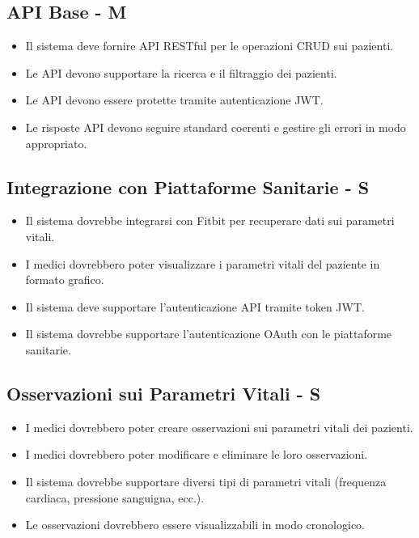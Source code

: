 \documentclass[12pt,a4paper,oneside]{report}
\begin{document}
\subsection{API Base - M}

\begin{itemize}
    \item Il sistema deve fornire API RESTful per le operazioni CRUD sui pazienti.
    \item Le API devono supportare la ricerca e il filtraggio dei pazienti.
    \item Le API devono essere protette tramite autenticazione JWT.
    \item Le risposte API devono seguire standard coerenti e gestire gli errori in modo appropriato.
\end{itemize}

\subsection{Integrazione con Piattaforme Sanitarie - S}

\begin{itemize}
    \item Il sistema dovrebbe integrarsi con Fitbit per recuperare dati sui parametri vitali.
    \item I medici dovrebbero poter visualizzare i parametri vitali del paziente in formato grafico.
    \item Il sistema deve supportare l'autenticazione API tramite token JWT.
    \item Il sistema dovrebbe supportare l'autenticazione OAuth con le piattaforme sanitarie.
\end{itemize}

\subsection{Osservazioni sui Parametri Vitali - S}

\begin{itemize}
    \item I medici dovrebbero poter creare osservazioni sui parametri vitali dei pazienti.
    \item I medici dovrebbero poter modificare e eliminare le loro osservazioni.
    \item Il sistema dovrebbe supportare diversi tipi di parametri vitali (frequenza cardiaca, pressione sanguigna, ecc.).
    \item Le osservazioni dovrebbero essere visualizzabili in modo cronologico.
\end{itemize}
\end{document}
